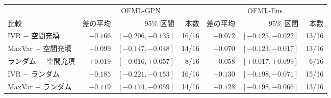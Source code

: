 \begin{tabular}{@{}l rrr rrr@{}}
\toprule
 & \multicolumn{3}{c}{OFML-GPN} & \multicolumn{3}{c}{OFML-Ens}\\
\cmidrule(lr){2-4}\cmidrule(l){5-7}
比較 & 差の平均 & 95\% 区間 & 本数 & 差の平均 & 95\% 区間 & 本数\\
\midrule
IVR $-$ 空間充填 & $-0.166$ & $[-0.206,-0.135]$ & 16/16 & $-0.072$ & $[-0.125,-0.022]$ & 13/16 \\
MaxVar $-$ 空間充填 & $-0.099$ & $[-0.147,-0.048]$ & 14/16 & $-0.070$ & $[-0.123,-0.017]$ & 13/16 \\
ランダム $-$ 空間充填 & $+0.019$ & $[-0.016,+0.057]$ & 8/16 & $+0.058$ & $[+0.017,+0.099]$ & 6/16 \\
IVR $-$ ランダム & $-0.185$ & $[-0.221,-0.153]$ & 16/16 & $-0.130$ & $[-0.198,-0.071]$ & 15/16 \\
MaxVar $-$ ランダム & $-0.119$ & $[-0.174,-0.059]$ & 14/16 & $-0.128$ & $[-0.198,-0.066]$ & 13/16 \\
\bottomrule
\end{tabular}
